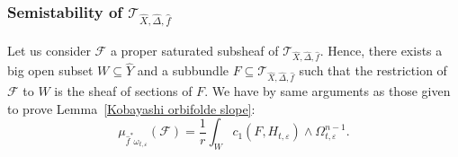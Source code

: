 \documentclass[12pt,a4paper]{amsart}
\theoremstyle{plain}
\theoremstyle{definition}
\begin{document}
\subsubsection{Semistability of $\mathcal{T}_{\widehat{X}, \widehat{\Delta}, \widehat{f}}$}\label{Semistability of the adapted tangent sheaf}

Let us consider $\mathcal{F}$ a proper saturated subsheaf of $\mathcal{T}_{\widehat{X}, \widehat{\Delta}, \widehat{f}}$. Hence, there exists a big open subset $W \subseteq \widehat{Y}$ and a subbundle $F \subseteq \mathcal{T}_{\widehat{X}, \widehat{\Delta}, \widehat{f}}$ such that the restriction of $\mathcal{F}$ to $W$ is the sheaf of sections of $F$. We have by same arguments as those given to prove Lemma~\ref{Kobayashi orbifolde slope}:
$$
\mu_{\widehat{f}^*\omega_{t, \varepsilon}}(\mathcal{F}) = \frac{1}{r}\int_{W} c_1(F, H_{t, \varepsilon}) \wedge \Omega_{t, \varepsilon}^{n-1}.
$$
\end{document}
